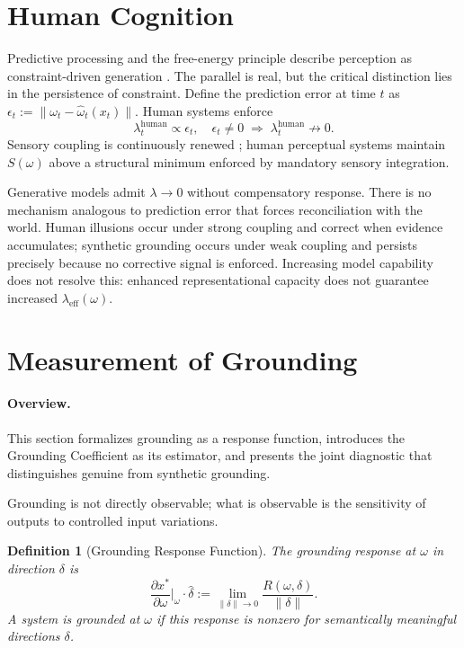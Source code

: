\documentclass[twocolumn,10pt]{article}
\theoremstyle{thmstyle}
\theoremstyle{defstyle}
\newtheorem{definition}[theorem]{Definition}
\newcommand{\leff}{\lambda_{\mathrm{eff}}}
\newcommand{\Rop}{R}
\begin{document}
\section{Human Cognition}
\label{sec:human}

Predictive processing and the free-energy principle describe perception
as constraint-driven generation \citep{friston2010freeenergy,clark2013whatever}.
The parallel is real, but the critical distinction lies in the
persistence of constraint. Define the prediction error at time $t$ as
$\epsilon_t := \|\omega_t - \hat\omega_t(x_t)\|$. Human systems
enforce
\[
  \lambda_t^{\mathrm{human}} \propto \epsilon_t,
  \quad
  \epsilon_t\neq 0 \;\Rightarrow\; \lambda_t^{\mathrm{human}}\not\to 0.
\]
Sensory coupling is continuously renewed \citep{friston2022active};
human perceptual systems maintain $S(\omega)$ above a structural minimum
enforced by mandatory sensory integration.

Generative models admit $\lambda\to 0$ without compensatory response.
There is no mechanism analogous to prediction error that forces
reconciliation with the world. Human illusions occur under strong
coupling and correct when evidence accumulates; synthetic grounding
occurs under weak coupling and persists precisely because no corrective
signal is enforced. Increasing model capability does not resolve this:
enhanced representational capacity does not guarantee increased
$\leff(\omega)$.

\section{Measurement of Grounding}
\label{sec:measurement}

\paragraph{Overview.}
This section formalizes grounding as a response function, introduces
the Grounding Coefficient as its estimator, and presents the joint
diagnostic that distinguishes genuine from synthetic grounding.

Grounding is not directly observable; what is observable is the
sensitivity of outputs to controlled input variations.

\begin{definition}[Grounding Response Function]
\label{def:grf}
The \emph{grounding response} at $\omega$ in direction $\delta$ is
\[
  \frac{\partial x^*}{\partial\omega}\bigg|_\omega\!\cdot\hat\delta
  := \lim_{\|\delta\|\to 0}
  \frac{\Rop(\omega,\delta)}{\|\delta\|}.
\]
A system is \emph{grounded} at $\omega$ if this response is nonzero for
semantically meaningful directions $\delta$.
\end{definition}
\end{document}
